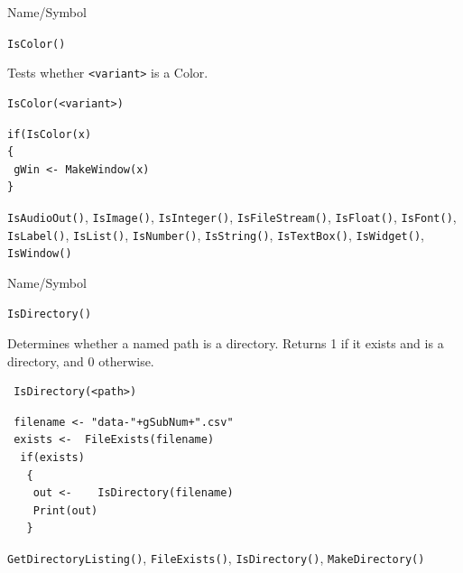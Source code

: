 \begin{desc}{Name/Symbol}
\item[Name/Symbol]	\verb+IsColor()+

\item[Description]	Tests whether \verb+<variant>+ is a Color.

\item[Usage]
\begin{verbatim}
IsColor(<variant>)
\end{verbatim}

\item[Example]
\begin{verbatim}
if(IsColor(x)
{
 gWin <- MakeWindow(x)
}
\end{verbatim}

\item[See Also] \verb+IsAudioOut()+, \verb+IsImage()+,
  \verb+IsInteger()+, \verb+IsFileStream()+, \verb+IsFloat()+,
  \verb+IsFont()+, \verb+IsLabel()+, \verb+IsList()+,
  \verb+IsNumber()+, \verb+IsString()+, \verb+IsTextBox()+,
  \verb+IsWidget()+, \verb+IsWindow()+
\end{desc}


\begin{desc}{Name/Symbol}
\item[Name/Symbol]	\verb+IsDirectory()+

\item[Description]	Determines whether a named path is a directory.  Returns 1 if it exists and is a directory, and 0 otherwise.
\item[Usage]		
\begin{verbatim}
 IsDirectory(<path>)
\end{verbatim}

\item[Example]	
\begin{verbatim}
 filename <- "data-"+gSubNum+".csv"
 exists <-  FileExists(filename)
  if(exists)
   {
    out <-    IsDirectory(filename)
    Print(out)
   }
\end{verbatim}

\item[See Also]\verb+GetDirectoryListing()+, \verb+FileExists()+,       \verb+IsDirectory()+,        
   \verb+MakeDirectory()+      

\end{desc}



